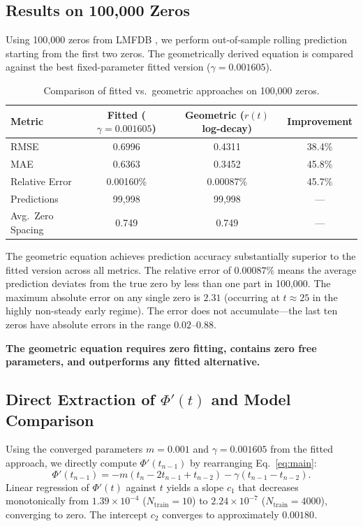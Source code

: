 \documentclass[12pt,a4paper]{article}
\begin{document}
\subsection{Results on 100,000 Zeros}

Using 100,000 zeros from LMFDB \cite{lmfdb}, we perform out-of-sample rolling prediction starting from the first two zeros. The geometrically derived equation is compared against the best fixed-parameter fitted version ($\gamma = 0.001605$).

\begin{table}[h]
\centering
\begin{tabular}{lccc}
\hline
\textbf{Metric} & \textbf{Fitted ($\gamma=0.001605$)} & \textbf{Geometric ($r(t)$ log-decay)} & \textbf{Improvement} \\
\hline
RMSE & 0.6996 & 0.4311 & 38.4\% \\
MAE & 0.6363 & 0.3452 & 45.8\% \\
Relative Error & 0.00160\% & 0.00087\% & 45.7\% \\
Predictions & 99,998 & 99,998 & --- \\
Avg.\ Zero Spacing & 0.749 & 0.749 & --- \\
\hline
\end{tabular}
\caption{Comparison of fitted vs.\ geometric approaches on 100,000 zeros.}
\label{tab:comparison}
\end{table}

The geometric equation achieves prediction accuracy substantially superior to the fitted version across all metrics. The relative error of $0.00087\%$ means the average prediction deviates from the true zero by less than one part in 100,000. The maximum absolute error on any single zero is $2.31$ (occurring at $t \approx 25$ in the highly non-steady early regime). The error does not accumulate---the last ten zeros have absolute errors in the range $0.02$--$0.88$.

\textbf{The geometric equation requires zero fitting, contains zero free parameters, and outperforms any fitted alternative.}

\subsection{Direct Extraction of $\Phi'(t)$ and Model Comparison}

Using the converged parameters $m = 0.001$ and $\gamma = 0.001605$ from the fitted approach, we directly compute $\Phi'(t_{n-1})$ by rearranging Eq.~\eqref{eq:main}:
\begin{equation}
\Phi'(t_{n-1}) = -m(t_n - 2t_{n-1} + t_{n-2}) - \gamma(t_{n-1} - t_{n-2}). \label{eq:rearranged}
\end{equation}
Linear regression of $\Phi'(t)$ against $t$ yields a slope $c_1$ that decreases monotonically from $1.39 \times 10^{-4}$ ($N_{\text{train}}=10$) to $2.24 \times 10^{-7}$ ($N_{\text{train}}=4000$), converging to zero. The intercept $c_2$ converges to approximately $0.00180$.
\end{document}

